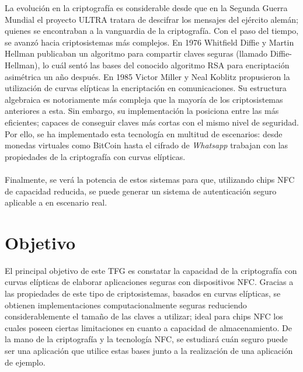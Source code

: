 \documentclass[../PFC.tex]{subfiles}
\begin{document}
La evolución en la criptografía es considerable desde que en la Segunda Guerra Mundial el proyecto ULTRA tratara de descifrar los mensajes del ejército alemán; quienes se encontraban a la vanguardia de la criptografía. Con el paso del tiempo, se avanzó hacia criptosistemas más complejos. En 1976 Whitfield Diffie y Martin Hellman publicaban un algoritmo para compartir claves seguras (llamado Diffie-Hellman)\cite{diffie1976new}, lo cuál sentó las bases del conocido algoritmo RSA \cite{rivest1978method} para encriptación asimétrica un año después. En 1985 Victor Miller y Neal Koblitz propusieron la utilización de curvas elípticas la encriptación en comunicaciones. Su estructura algebraica es notoriamente más compleja que la mayoría de los criptosistemas anteriores a esta. Sin embargo, su implementación la posiciona entre las más eficientes; capaces de conseguir claves más cortas con el mismo nivel de seguridad\cite{lucena}. Por ello, se ha implementado esta tecnología en multitud de escenarios: desde monedas virtuales como BitCoin hasta el cifrado de \textit{Whatsapp}\cite{whatsappEncryption} trabajan con las propiedades de la criptografía con curvas elípticas.
\\\\
Finalmente, se verá la potencia de estos sistemas para que, utilizando chips NFC de capacidad reducida, se puede generar un sistema de autenticación seguro aplicable a en escenario real.

\section{Objetivo}
\label{Objetivo}

El principal objetivo de este TFG es constatar la capacidad de la criptografía con curvas elípticas de elaborar aplicaciones seguras con dispositivos NFC. Gracias a las propiedades de este tipo de criptosistemas, basados en curvas elípticas, se obtienen implementaciones computacionalmente seguras reduciendo considerablemente el tamaño de las claves a utilizar; ideal para chips NFC los cuales poseen ciertas limitaciones en cuanto a capacidad de almacenamiento. De la mano de la criptografía y la tecnología NFC, se estudiará cuán seguro puede ser una aplicación que utilice estas bases junto a la realización de una aplicación de ejemplo.
\end{document}
